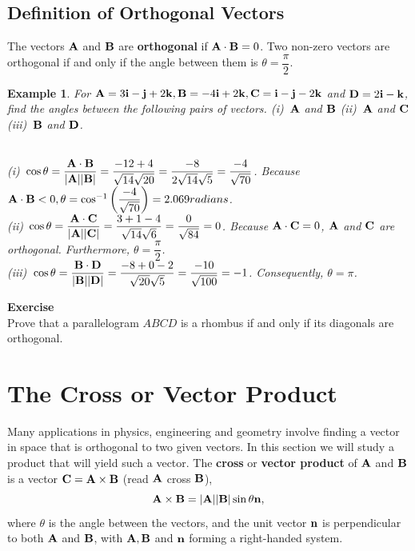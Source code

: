 \documentclass[titlepage,a4paper,12pt]{report}
\newtheorem{example}{Example}[section]
\begin{document}
\subsection{Definition of Orthogonal Vectors }
The vectors ${\bf{A}}$ and ${\bf{B}}$ are \textbf{orthogonal} if ${\bf{A\cdot B}}=0$. Two non-zero vectors are orthogonal if and only if the angle between them is $\theta=\dfrac{\pi}{2}$.
\begin{example}
For ${\bf{A}}=3{\bf{i}}-{\bf{j}}+2{\bf{k}}, {\bf{B}}=-4{\bf{i}}+2{\bf{k}}, {\bf{C}}={\bf{i}}-{\bf{j}}-2{\bf{k}}$  and ${\bf{D}}=2{\bf{i}}-{\bf{k}}$, find the angles between the following pairs of vectors. (i)\, ${\bf{A}}$ and ${\bf{B}}$ (ii)\, ${\bf{A}}$ and ${\bf{C}}$ (iii)\, ${\bf{B}}$ and ${\bf{D}}$.

 \\
(i)\, $\cos \theta = \dfrac{{\bf{A\cdot \bf{B}}}}{|{\bf{A}}||{\bf{B}}|}=\dfrac{-12+4}{\sqrt{14}\sqrt{20}}=\dfrac{-8}{2\sqrt{14}\sqrt{5}}=\dfrac{-4}{\sqrt{70}}$. Because ${\bf{A\cdot B}}<0, \\ \theta =\cos ^{-1}\left(\dfrac{-4}{\sqrt{70}}\right)=2.069 radians$.\\
(ii)\, $\cos \theta =\dfrac{{\bf{A\cdot C}}}{|{\bf{A}}||{\bf{C}}|}=\dfrac{3+1-4}{\sqrt{14}\sqrt{6}}=\dfrac{0}{\sqrt{84}}=0$. Because ${\bf{A\cdot C}}=0$, ${\bf{A}}$ and ${\bf{C}}$ are orthogonal. Furthermore, $\theta =\dfrac{\pi}{2}$.\\
(iii)\, $\cos \theta =\dfrac{{\bf{B\cdot D}}}{|{\bf{B}}||{\bf{D}}|}=\dfrac{-8+0-2}{\sqrt{20}\sqrt{5}}=\dfrac{-10}{\sqrt{100}}=-1$. Consequently, $\theta =\pi$.
\end{example}
\noindent\textbf{Exercise}\\
Prove that a parallelogram $ABCD$ is a rhombus if and only if its diagonals are orthogonal.
\section{The Cross or Vector Product}
Many applications in physics, engineering and geometry involve finding a vector in space that is orthogonal to two given vectors. In this section we will study a product that will yield such a vector. The \textbf{cross} or \textbf{vector product} of ${\bf{A}}$ and ${\bf{B}}$ is a vector ${\bf{C}}={\bf{A}\times \bf{B}}$ (read ${\bf{A}}$ cross ${\bf{B}}$), 
\[{\bf{A}}\times {\bf{B}}=|{\bf{A}}||{\bf{B}}|\sin \theta {\bf{n}},\] where $\theta$ is the angle between the vectors, and the unit vector ${\bf{n}}$ is perpendicular to both ${\bf{A}}$ and ${\bf{B}}$, with ${\bf{A}, \bf{B}}$ and ${\bf{n}}$ forming a right-handed system.
\end{document}
